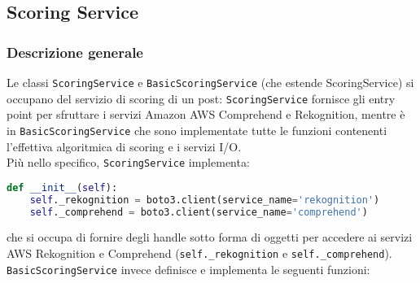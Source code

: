 \subsection{Scoring Service}
\subsubsection{Descrizione generale}
Le classi \verb+ScoringService+ e \verb+BasicScoringService+ (che estende ScoringService\verb++) si occupano
del servizio di scoring di un post: \verb+ScoringService+ fornisce gli entry point per sfruttare 
i servizi Amazon AWS Comprehend e Rekognition, mentre è in \verb+BasicScoringService+ che sono 
implementate tutte le funzioni contenenti l'effettiva algoritmica di scoring e i servizi I/O.\\
Più nello specifico, \verb+ScoringService+ implementa:
\begin{lstlisting}[language=Python]
def __init__(self):
    self._rekognition = boto3.client(service_name='rekognition')
    self._comprehend = boto3.client(service_name='comprehend')
\end{lstlisting}
che si occupa di fornire degli handle sotto forma di oggetti per accedere ai servizi AWS Rekognition
e Comprehend (\verb+self._rekognition+ e \verb+self._comprehend+).\\
\verb+BasicScoringService+ invece definisce e implementa le seguenti funzioni:

